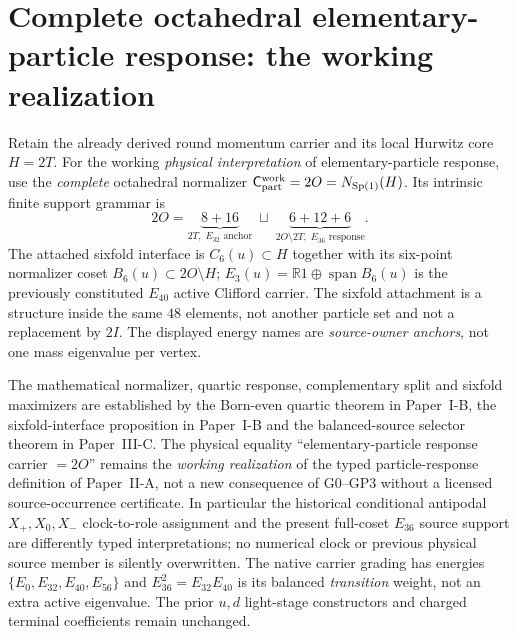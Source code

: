 \documentclass[12pt,a4paper]{article}
\begin{document}
\section{Complete octahedral elementary-particle response: the working realization}
\label{p5b:sec:v5200-full-octahedral-particle-role}
\begin{definition}
\label{p5b:def:v5200-full-octahedral-particle-role}
Retain the already derived round momentum carrier and its local
Hurwitz core $H=2T$.  For the working \emph{physical interpretation}
of elementary-particle response, use the \emph{complete} octahedral
normalizer $\mathsf C_{\rm part}^{\rm work}=2O=N_{\operatorname{Sp}(1)}(H)$.
Its intrinsic finite support grammar is
\[
 \boxed{2O=\underbrace{8+16}_{2T,\;E_{32}\text{ anchor}}
          \;\sqcup\;
          \underbrace{6+12+6}_{2O\setminus2T,\;E_{36}\text{ response}}.}
\]
The attached sixfold interface is $C_6(u)\subset H$ together with
its six-point normalizer coset $B_6(u)\subset2O\setminus H$;
$E_3(u)=\mathbb R1\oplus\operatorname{span}B_6(u)$ is the previously
constituted $E_{40}$ active Clifford carrier.  The sixfold attachment
is a structure inside the same $48$ elements, not another particle
set and not a replacement by $2I$.  The displayed energy names are
\emph{source-owner anchors}, not one mass eigenvalue per vertex.
\end{definition}
\begin{remark}
\label{p5b:rem:v5200-full-octahedral-physical-gate}
The mathematical normalizer, quartic response, complementary split
and sixfold maximizers are established by
the Born-even quartic theorem in Paper~I-B,
the sixfold-interface proposition in Paper~I-B
and the balanced-source selector theorem in Paper~III-C.
The physical equality ``elementary-particle response carrier $=2O$''
remains the \emph{working realization} of
the typed particle-response definition of Paper~II-A, not a
new consequence of G0--GP3 without a licensed source-occurrence
certificate.  In particular the historical conditional antipodal
$X_+,X_0,X_-$ clock-to-role assignment and the present full-coset
$E_{36}$ source support are differently typed interpretations;
no numerical clock or previous physical source member is
silently overwritten.  The native carrier grading has energies
$\{E_0,E_{32},E_{40},E_{56}\}$ and
$E_{36}^2=E_{32}E_{40}$ is its balanced \emph{transition} weight,
not an extra active eigenvalue.  The prior $u,d$ light-stage
constructors and charged terminal coefficients remain unchanged.
\end{remark}
\end{document}
